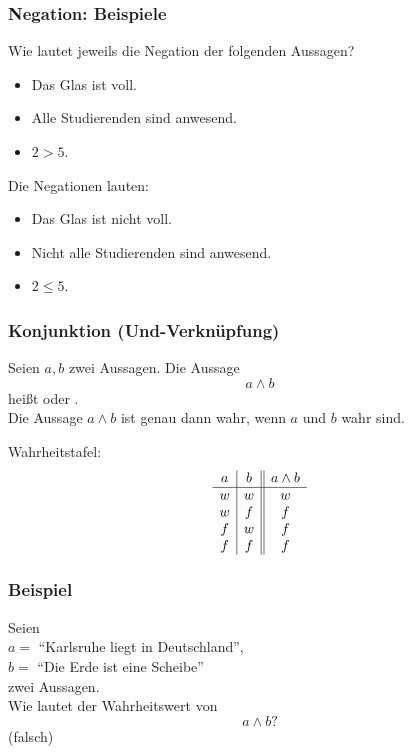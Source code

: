\begin{frame}\frametitle{Negation: Beispiele}
	
	Wie lautet jeweils die Negation der folgenden Aussagen?
	\begin{itemize}
		\item Das Glas ist voll.
		\item Alle Studierenden sind anwesend.
		\item $2 > 5$.
	\end{itemize}
	\vfill
	\pause
	Die Negationen lauten:
	\begin{itemize}
		\item<2-> Das Glas ist nicht voll. 
		\item<3-> Nicht alle Studierenden sind anwesend.
		\item<4-> $2\leq 5$.
	\end{itemize}
	
\end{frame}
%
%
\begin{frame}\frametitle{Konjunktion (Und-Verknüpfung)}
	
	Seien $a, b$ zwei Aussagen. Die Aussage
	$$
		a \land b
	$$
	heißt  oder . \\[1mm]
	
	Die Aussage $a \land b$ ist genau dann wahr, wenn $a$ und $b$ wahr sind.

	\vfill
	Wahrheitstafel:
	$$
		\begin{array}{c | c || c}
			a	& b	& a\land b	\\ \hline
			w	& w	& w		\\
			w	& f	& f		\\
			f	& w	& f		\\
			f	& f	& f	
		\end{array}
	$$
	
\end{frame}
%
%
\begin{frame}\frametitle{Beispiel}
	
	Seien \\
	$a = $ ``Karlsruhe liegt in Deutschland'',\\
	$b = $ ``Die Erde ist eine Scheibe''\\
	 zwei Aussagen.\\[2mm]
	 
	 Wie lautet der Wahrheitswert von 
	 $$
	 	a\land b?
	 $$
	 \pause
	 (falsch)
	
\end{frame}
%
